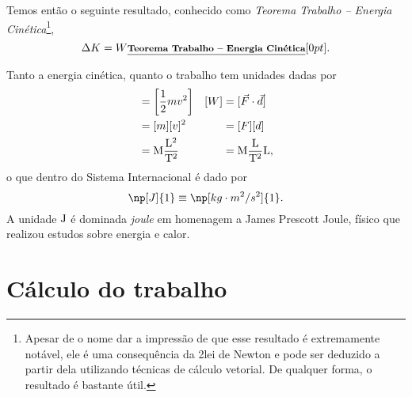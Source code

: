 Temos então o seguinte resultado, conhecido como \emph{Teorema Trabalho -- Energia Cinética}\footnote[][15mm]{Apesar de o nome dar a impressão de que esse resultado é extremamente notável, ele é uma consequência da 2\textordfeminine lei de Newton e pode ser deduzido a partir dela utilizando técnicas de cálculo vetorial. De qualquer forma, o resultado é bastante útil.},
\begin{equation}
  \Delta K = W \relax{\footnotesize\emph{\textbf{Teorema Trabalho -- Energia Cinética}}}[0pt].
\end{equation}

Tanto a energia cinética, quanto o trabalho tem unidades dadas por
\begin{align*}
    [K] &= \left[\frac{1}{2} mv^2\right] & [W] &= [\vec{F}\cdot\vec{d}] \\
    &=[m][v]^2 & &= [F][d] \\
    &=\rm{M}\frac{\rm{L}^2}{\rm{T}^2} & &= \rm{M}\frac{\rm{L}}{\rm{T}^2} \rm{L},
\end{align*}
%
o que dentro do Sistema Internacional é dado por
\begin{equation}
    \np[J]{1} \equiv \np[kg\cdot m^2/s^2]{1}.
\end{equation}
%
A unidade $\rm{J}$ é dominada \emph{joule} em homenagem a James Prescott Joule, físico que realizou estudos sobre energia e calor.

\section{Cálculo do trabalho}

